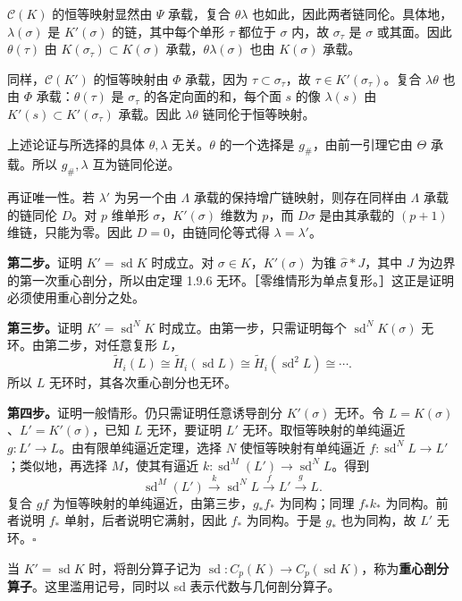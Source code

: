 $\mathcal C(K)$ 的恒等映射显然由 $\Psi$ 承载，复合 $\theta\lambda$ 也如此，因此两者链同伦。具体地，$\lambda(\sigma)$ 是 $K'(\sigma)$ 的链，其中每个单形 $\tau$ 都位于 $\sigma$ 内，故 $\sigma_\tau$ 是 $\sigma$ 或其面。因此 $\theta(\tau)$ 由 $K(\sigma_\tau)\subset K(\sigma)$ 承载，$\theta\lambda(\sigma)$ 也由 $K(\sigma)$ 承载。

同样，$\mathcal C(K')$ 的恒等映射由 $\Phi$ 承载，因为 $\tau\subset\sigma_\tau$，故 $\tau\in K'(\sigma_\tau)$。复合 $\lambda\theta$ 也由 $\Phi$ 承载：$\theta(\tau)$ 是 $\sigma_\tau$ 的各定向面的和，每个面 $s$ 的像 $\lambda(s)$ 由 $K'(s)\subset K'(\sigma_\tau)$ 承载。因此 $\lambda\theta$ 链同伦于恒等映射。

上述论证与所选择的具体 $\theta,\lambda$ 无关。$\theta$ 的一个选择是 $g_\#$，由前一引理它由 $\Theta$ 承载。所以 $g_\#,\lambda$ 互为链同伦逆。

再证唯一性。若 $\lambda'$ 为另一个由 $\Lambda$ 承载的保持增广链映射，则存在同样由 $\Lambda$ 承载的链同伦 $D$。对 $p$ 维单形 $\sigma$，$K'(\sigma)$ 维数为 $p$，而 $D\sigma$ 是由其承载的 $(p+1)$ 维链，只能为零。因此 $D=0$，由链同伦等式得 $\lambda=\lambda'$。

\textbf{第二步。}证明 $K'=\operatorname{sd}K$ 时成立。对 $\sigma\in K$，$K'(\sigma)$ 为锥 $\widehat\sigma*J$，其中 $J$ 为边界的第一次重心剖分，所以由定理 1.9.6 无环。［零维情形为单点复形。］这正是证明必须使用重心剖分之处。

\textbf{第三步。}证明 $K'=\operatorname{sd}^NK$ 时成立。由第一步，只需证明每个 $\operatorname{sd}^NK(\sigma)$ 无环。由第二步，对任意复形 $L$，
\[
\widetilde H_i(L)\cong\widetilde H_i(\operatorname{sd}L)
\cong\widetilde H_i(\operatorname{sd}^2L)\cong\cdots.
\]
所以 $L$ 无环时，其各次重心剖分也无环。

\textbf{第四步。}证明一般情形。仍只需证明任意诱导剖分 $K'(\sigma)$ 无环。令 $L=K(\sigma)$、$L'=K'(\sigma)$，已知 $L$ 无环，要证明 $L'$ 无环。取恒等映射的单纯逼近 $g:L'\to L$。由有限单纯逼近定理，选择 $N$ 使恒等映射有单纯逼近 $f:\operatorname{sd}^NL\to L'$；类似地，再选择 $M$，使其有逼近 $k:\operatorname{sd}^M(L')\to\operatorname{sd}^NL$。得到
\[
\operatorname{sd}^M(L')\xrightarrow{k}\operatorname{sd}^NL
\xrightarrow{f}L'\xrightarrow{g}L.
\]
复合 $gf$ 为恒等映射的单纯逼近，由第三步，$g_*f_*$ 为同构；同理 $f_*k_*$ 为同构。前者说明 $f_*$ 单射，后者说明它满射，因此 $f_*$ 为同构。于是 $g_*$ 也为同构，故 $L'$ 无环。\hfill$\square$

当 $K'=\operatorname{sd}K$ 时，将剖分算子记为 $\operatorname{sd}:C_p(K)\to C_p(\operatorname{sd}K)$，称为\textbf{重心剖分算子}。这里滥用记号，同时以 sd 表示代数与几何剖分算子。

